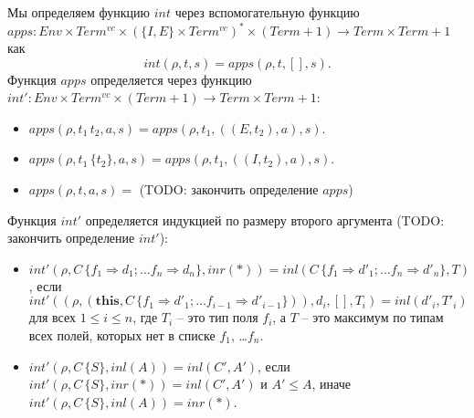 \documentclass{amsart}
\theoremstyle{definition}
\theoremstyle{remark}
\newcommand{\red}{\Rightarrow}
\numberwithin{figure}{section}
\begin{document}
Мы определяем функцию $int$ через вспомогательную функцию $apps : Env \times Term^{vc} \times (\{ I, E \} \times Term^{vc})^* \times (Term + 1) \to Term \times Term + 1$ как
\[ int(\rho, t, s) = apps(\rho, t, [], s). \]
Функция $apps$ определяется через функцию $int' : Env \times Term^{vc} \times (Term + 1) \to Term \times Term + 1$:
\begin{itemize}
\item $apps(\rho, t_1\,t_2, a, s) = apps(\rho, t_1, ((E, t_2), a), s)$.
\item $apps(\rho, t_1\,\{t_2\}, a, s) = apps(\rho, t_1, ((I, t_2), a), s)$.
\item $apps(\rho, t, a, s) = $ (TODO: закончить определение $apps$)
\end{itemize}
Функция $int'$ определяется индукцией по размеру второго аргумента (TODO: закончить определение $int'$):
\begin{itemize}
\item $int'(\rho, C\,\{ f_1 \red d_1; \ldots f_n \red d_n \}, inr(*)) = inl(C\,\{ f_1 \red d'_1; \ldots f_n \red d'_n \}, T)$, если
    $int'((\rho, (\mathbf{this}, C\,\{ f_1 \red d'_1; \ldots f_{i-1} \red d'_{i-1} \})), d_i, [], T_i) = inl(d'_i, T'_i)$
    для всех $1 \leq i \leq n$, где $T_i$ -- это тип поля $f_i$, а $T$ -- это максимум по типам всех полей, которых нет в списке $f_1$, \ldots $f_n$.
\item $int'(\rho, C\,\{ S \}, inl(A)) = inl(C', A')$, если $int'(\rho, C\,\{ S \}, inr(*)) = inl(C', A')$ и $A' \leq A$, иначе $int'(\rho, C\,\{ S \}, inl(A)) = inr(*)$.
\end{itemize}



\end{document}
